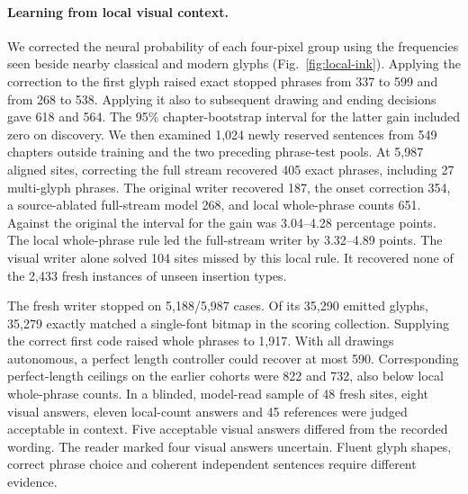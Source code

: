 \documentclass[12pt,a4paper]{article}
\providecommand{\DIFadd}[1]{{\protect\color{blue} \sf #1}} %
\begin{document}
\paragraph{\DIFadd{Learning from local visual context.}}
\DIFadd{We corrected the neural probability of each four-pixel group using the frequencies seen beside nearby classical and modern glyphs (Fig.~\ref{fig:local-ink}). Applying the correction to the first glyph raised exact stopped phrases from 337 to 599 and from 268 to 538. Applying it also to subsequent drawing and ending decisions gave 618 and 564. The 95\% chapter-bootstrap interval for the latter gain included zero on discovery. We then examined 1,024 newly reserved sentences from 549 chapters outside training and the two preceding phrase-test pools. At 5,987 aligned sites, correcting the full stream recovered 405 exact phrases, including 27 multi-glyph phrases. The original writer recovered 187, the onset correction 354, a source-ablated full-stream model 268, and local whole-phrase counts 651. Against the original the interval for the gain was 3.04--4.28 percentage points. The local whole-phrase rule led the full-stream writer by 3.32--4.89 points. The visual writer alone solved 104 sites missed by this local rule. It recovered none of the 2,433 fresh instances of unseen insertion types.
}

\DIFadd{The fresh writer stopped on 5,188/5,987 cases. Of its 35,290 emitted glyphs, 35,279 exactly matched a single-font bitmap in the scoring collection. Supplying the correct first code raised whole phrases to 1,917. With all drawings autonomous, a perfect length controller could recover at most 590. Corresponding perfect-length ceilings on the earlier cohorts were 822 and 732, also below local whole-phrase counts. In a blinded, model-read sample of 48 fresh sites, eight visual answers, eleven local-count answers and 45 references were judged acceptable in context. Five acceptable visual answers differed from the recorded wording. The reader marked four visual answers uncertain. Fluent glyph shapes, correct phrase choice and coherent independent sentences require different evidence.
}
\end{document}
